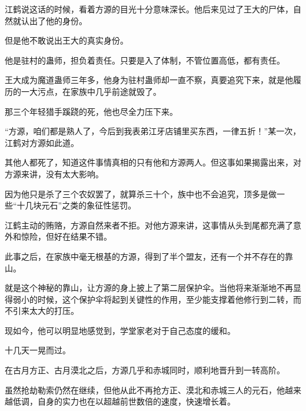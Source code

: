 \begin{this_body}
江鹤说这话的时候，看着方源的目光十分意味深长。他后来见过了王大的尸体，自然就认出了他的身份。

但是他不敢说出王大的真实身份。

他是驻村的蛊师，担负着责任。只要是入了体制，不管位置高低，都有责任。

王大成为魔道蛊师三年多，他身为驻村蛊师却一直不察，真要追究下来，就是他履历的一大污点，在家族中几乎前途就毁了。

那三个年轻猎手蹊跷的死，他也尽全力压下来。

“方源，咱们都是熟人了，今后到我表弟江牙店铺里买东西，一律五折！”某一次，江鹤对方源如此道。

其他人都死了，知道这件事情真相的只有他和方源两人。但这事如果揭露出来，对方源来讲，没有太大影响。

因为他只是杀了三个农奴罢了，就算杀三十个，族中也不会追究，顶多是做一些“十几块元石”之类的象征性惩罚。

江鹤主动的贿赂，方源自然来者不拒。对他方源来讲，这事情从头到尾都充满了意外和惊险，但好在结果不错。

此事之后，在家族中毫无根基的方源，得到了半个盟友，还有一个并不存在的靠山。

就是这个神秘的靠山，让方源的身上披上了第二层保护伞。当他将来渐渐地不再显得弱小的时候，这个保护伞将起到关键性的作用，至少能支撑着他修行到二转，而不引来太大的打压。

现如今，他可以明显地感觉到，学堂家老对于自己态度的缓和。

十几天一晃而过。

在古月方正、古月漠北之后，方源几乎和赤城同时，顺利地晋升到一转高阶。

虽然抢劫勒索仍然在继续，但他从此不再抢方正、漠北和赤城三人的元石，他越来越低调，自身的实力也在以超越前世数倍的速度，快速增长着。

\end{this_body}

